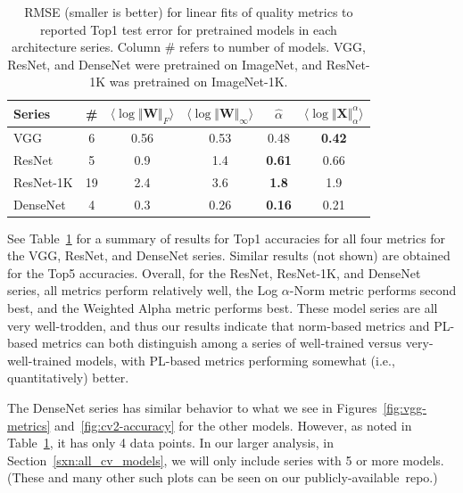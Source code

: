 \begin{table}[t]
\small
\begin{center}
\begin{tabular}{|p{1in}|c|c|c|c|c|}
\hline
 Series    &\#   & $\langle\log\Vert\mathbf{W}\Vert_{F}\rangle$ & $\langle\log\Vert\mathbf{W}\Vert_{\infty}\rangle$ & $\hat{\alpha}$ & $\langle\log\Vert\mathbf{X}\Vert^{\alpha}_{\alpha}\rangle$ \\
\hline
 VGG       &  6 & 0.56 & 0.53 & 0.48          & \textbf{0.42}  \\
 ResNet    &  5 & 0.9  & 1.4  & \textbf{0.61} & 0.66           \\
 ResNet-1K & 19 & 2.4  & 3.6  & \textbf{1.8}  & 1.9            \\
 DenseNet  &  4 & 0.3  & 0.26 & \textbf{0.16} & 0.21           \\
\hline
\end{tabular}
\end{center}
\caption{RMSE (smaller is better) for linear fits of 
         quality metrics to reported Top1 test error for pretrained models in each architecture series.  Column \# refers to number of models.  VGG, ResNet, and DenseNet were pretrained on ImageNet, and ResNet-1K was pretrained on ImageNet-1K. 
}
\label{table:cv-models}
\end{table}

See Table~\ref{table:cv-models} for a summary of results for Top1 accuracies for all four metrics for the VGG, ResNet, and DenseNet series.
Similar results (not shown) are obtained for the Top5 accuracies.
Overall, for the ResNet, ResNet-1K, and DenseNet series, all metrics perform relatively well, the Log $\alpha$-Norm metric performs second best, and the Weighted Alpha metric performs best.
These model series are all very well-trodden, and thus our results indicate that norm-based metrics and PL-based metrics can both distinguish among a series of well-trained versus very-well-trained models, with PL-based metrics performing somewhat (i.e., quantitatively) better.

The DenseNet series has similar behavior to what we see in Figures~\ref{fig:vgg-metrics} and~\ref{fig:cv2-accuracy} for the other models.
However, as noted in Table~\ref{table:cv-models}, it has only 4 data points.  
In our larger analysis, in Section~\ref{sxn:all_cv_models}, we will only include series with 5 or more models.
(These and many other such plots can be seen on our publicly-available~repo.)


